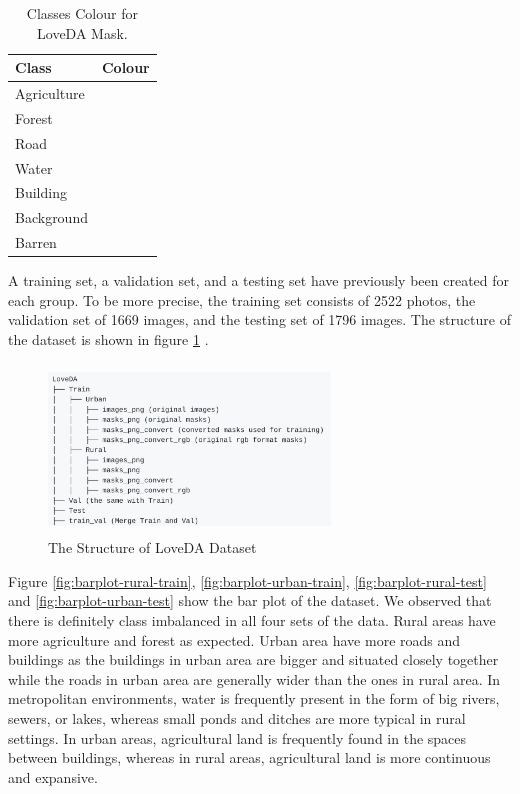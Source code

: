 \FloatBarrier

\begin{table}[]
\centering
\begin{tabular}{|l|l}
\hline
\multicolumn{1}{|l|}{\textbf{Class}} & \multicolumn{1}{l|}{\textbf{Colour}} \\ \hline
       Agriculture & \cellcolor[HTML]{ffff00}             \\\cline{1-1}
       Forest & \cellcolor[HTML]{76ee00}             \\\cline{1-1}
       Road & \cellcolor[HTML]{c1cdcd}             \\\cline{1-1}
        Water & \cellcolor[HTML]{0000ff}             \\\cline{1-1}
        Building & \cellcolor[HTML]{ff4040}             \\\cline{1-1}
       Background & \cellcolor[HTML]{000000}             \\\cline{1-1}
       Barren & \cellcolor[HTML]{8a360f}            \\ \cline{1-1}
\end{tabular}
\caption{Classes Colour for LoveDA Mask.}
\label{tab:mask-loveda}
\end{table}
\FloatBarrier

A training set, a validation set, and a testing set have previously been created for each group. To be more precise, the training set consists of 2522 photos, the validation set of 1669 images, and the testing set of 1796 images. The structure of the dataset is shown in figure \ref{fig:loveda-structure} .

\FloatBarrier
\begin{figure}[!h]
\includegraphics[width=7.5cm, height=4.5cm]{images/loveda-structure.png}
\centering
\caption{The Structure of LoveDA Dataset}
\label{fig:loveda-structure}
\end{figure}

 Figure \ref{fig:barplot-rural-train}, \ref{fig:barplot-urban-train}, \ref{fig:barplot-rural-test} and \ref{fig:barplot-urban-test} show the bar plot of the  dataset. We observed that there is definitely class imbalanced in all four sets of the data. Rural areas have more agriculture and forest as expected. Urban area have more roads and buildings as the buildings in urban area are bigger and situated closely together while the roads in urban area are generally wider than the ones in rural area. In metropolitan environments, water is frequently present in the form of big rivers, sewers, or lakes, whereas small ponds and ditches are more typical in rural settings. In urban areas, agricultural land is frequently found in the spaces between buildings, whereas in rural areas, agricultural land is more continuous and expansive.


